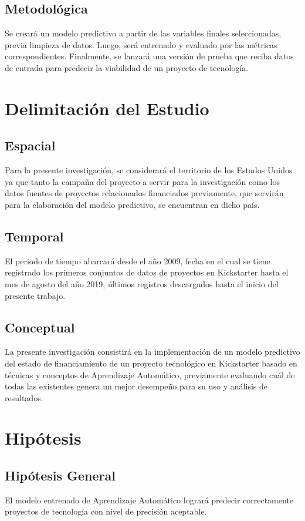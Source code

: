 \subsection{Metodológica}
Se creará un modelo predictivo a partir de las variables finales seleccionadas, previa limpieza de datos. Luego, será entrenado y evaluado por las métricas correspondientes. Finalmente, se lanzará una versión de prueba que reciba datos de entrada para predecir la viabilidad de un proyecto de tecnología.

\section{Delimitación del Estudio}

\subsection{Espacial}
Para la presente investigación, se considerará el territorio de los Estados Unidos ya que tanto la campaña del proyecto a servir para la investigación como los datos fuentes de proyectos relacionados financiados previamente, que servirán para la elaboración del modelo predictivo, se encuentran en dicho país.

\subsection{Temporal}
El periodo de tiempo abarcará desde el año 2009, fecha en el cual se tiene registrado los primeros conjuntos de datos de proyectos en Kickstarter hasta el mes de agosto del año 2019, últimos registros descargados hasta el inicio del presente trabajo.

\subsection{Conceptual}
La presente investigación consistirá en la implementación de un modelo predictivo del estado de financiamiento de un proyecto tecnológico en Kickstarter basado en técnicas y conceptos de Aprendizaje Automático, previamente evaluando cuál de todas las existentes genera un mejor desempeño para su uso y análisis de resultados.

\section{Hipótesis}

\subsection{Hipótesis General}
\newcommand{\HipotesisGeneral}{
El modelo entrenado de Aprendizaje Automático logrará predecir correctamente proyectos de tecnología con nivel de precisión aceptable.
}
\HipotesisGeneral
